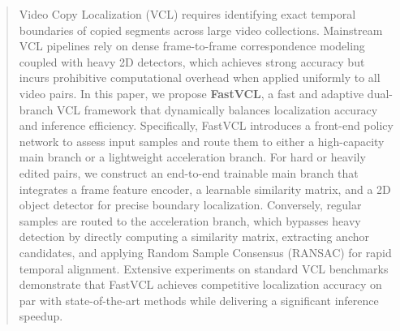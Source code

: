 \begin{abstract}
Video Copy Localization (VCL) requires identifying exact temporal boundaries of copied segments across large video collections.
%
Mainstream VCL pipelines rely on dense frame-to-frame correspondence modeling coupled with heavy 2D detectors, which achieves strong accuracy but incurs prohibitive computational overhead when applied uniformly to all video pairs. 
%
In this paper, we propose \textbf{FastVCL}, a fast and adaptive dual-branch VCL framework that dynamically balances localization accuracy and inference efficiency. 
%
Specifically, FastVCL introduces a front-end policy network to assess input samples and route them to either a high-capacity main branch or a lightweight acceleration branch. 
%
For hard or heavily edited pairs, we construct an end-to-end trainable main branch that integrates a frame feature encoder, a learnable similarity matrix, and a 2D object detector for precise boundary localization. 
%
Conversely, regular samples are routed to the acceleration branch, which bypasses heavy detection by directly computing a similarity matrix, extracting anchor candidates, and applying Random Sample Consensus (RANSAC) for rapid temporal alignment.
%
Extensive experiments on standard VCL benchmarks demonstrate that FastVCL achieves competitive localization accuracy on par with state-of-the-art methods while delivering a significant inference speedup.
\end{abstract}
